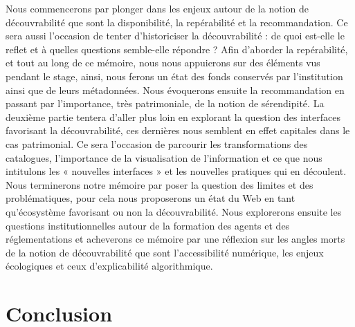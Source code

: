 \documentclass[a4paper,12pt,twoside]{book}
\begin{document}
	Nous commencerons par plonger dans les enjeux autour de la notion de découvrabilité que sont la disponibilité, la repérabilité et la recommandation. Ce sera aussi l’occasion de tenter d’historiciser la découvrabilité : de quoi est-elle le reflet et à quelles questions semble-elle répondre ? Afin d’aborder la repérabilité, et tout au long de ce mémoire, nous nous appuierons sur des éléments vus pendant le stage, ainsi, nous ferons un état des fonds conservés par l’institution ainsi que de leurs métadonnées. Nous évoquerons ensuite la recommandation en passant par l’importance, très patrimoniale, de la notion de sérendipité. La deuxième partie tentera d’aller plus loin en explorant la question des interfaces favorisant la découvrabilité, ces dernières nous semblent en effet capitales dans le cas patrimonial. Ce sera l’occasion de parcourir les transformations des catalogues, l’importance de la visualisation de l’information et ce que nous intitulons les « nouvelles interfaces » et les nouvelles pratiques qui en découlent. Nous terminerons notre mémoire par poser la question des limites et des problématiques, pour cela nous proposerons un état du Web en tant qu’écosystème favorisant ou non la découvrabilité. Nous explorerons ensuite les questions institutionnelles autour de la formation des agents et des réglementations et acheverons ce mémoire par une réflexion sur les angles morts de la notion de découvrabilité que sont l’accessibilité numérique, les enjeux écologiques et ceux d’explicabilité algorithmique.
	\newpage{\pagestyle{empty}\cleardoublepage}
	
	\mainmatter
	
	
	

	
	


	

	
	
	
	
	\chapter*{Conclusion}
		
\end{document}

